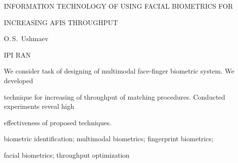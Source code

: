 INFORMATION TECHNOLOGY OF USING FACIAL BIOMETRICS FOR

INCREASING AFIS THROUGHPUT



O.\,S.~Ushmaev

IPI RAN



We consider task of designing of multimodal face-finger biometric system. We developed

technique for increasing of throughput of matching procedures. Conducted experiments reveal high

effectiveness of proposed techniques.



biometric identification; multimodal biometrics; fingerprint biometrics;

facial  biometrics; throughput optimization




